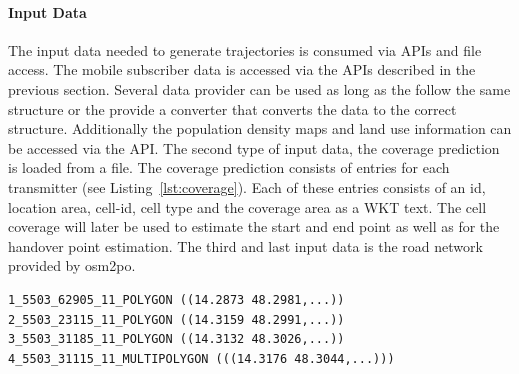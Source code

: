 \documentclass[master,english]{hgbthesis}
\begin{document}
\paragraph{Input Data}
The input data needed to generate trajectories is consumed via APIs and file access. The mobile subscriber data is accessed via the APIs described in the previous section. Several data provider can be used as long as the follow the same structure or the provide a converter that converts the data to the correct structure. Additionally the population density maps and land use information can be accessed via the API. The second type of input data, the coverage prediction is loaded from a file. The coverage prediction consists of entries for each transmitter (see Listing~\ref{lst:coverage}). Each of these entries consists of an id, location area, cell-id, cell type and the coverage area as a WKT text. The cell coverage will later be used to estimate the start and end point as well as for the handover point estimation. The third and last input data is the road network provided by osm2po.
\begin{lstlisting}[style=BashInputStyle,caption={Coverage prediction},label={lst:coverage}]
1_5503_62905_11_POLYGON ((14.2873 48.2981,...))
2_5503_23115_11_POLYGON ((14.3159 48.2991,...))
3_5503_31185_11_POLYGON ((14.3132 48.3026,...))
4_5503_31115_11_MULTIPOLYGON (((14.3176 48.3044,...)))
\end{lstlisting}
\end{document}
